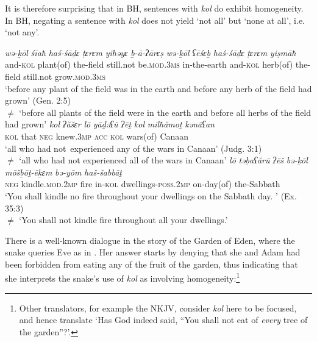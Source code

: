 \documentclass[output=paper]{langsci/langscibook}
\begin{document}
It is therefore surprising that in BH, sentences with \textit{kol} do exhibit homogeneity. In BH, negating a sentence with \textit{kol} does not yield ‘not all’ but ‘none at all’, i.e. ‘not any’.\largerpage

\ea%
    \label{ex:doron:29}
    \ea
    \gll \textit{wə-ḵōl}     \textit{śīaħ}         \textit{haś-śāḏɛ} \textit{ṭɛrɛm}     \textit{yihǝyɛ}           \textit{ḇ-ā-ʔārɛṣ}    \textit{wə{}-ḵōl}    \textit{ʕēśɛḇ} \textit{haś-śāḏɛ} \textit{ṭɛrɛm} \textit{yiṣmāħ}\\
         and-\textsc{kol} plant(of) the-field  still.not be.\textsc{mod.3ms} in-the-earth and-\textsc{kol} herb(of) the-field still.not grow.\textsc{mod.3ms}\\
    \glt `before any plant of the field was in the earth and before any herb of the field had grown' (Gen. 2:5)\\ 
        ${\neq}$  `before all plants of the field were in the earth and before all herbs of the field had grown'
    \ex
    \gll \textit{kol}   \textit{ʔăšɛr} \textit{lō}     \textit{yāḏəʕū}      \textit{ʔēṯ}   \textit{kol}   \textit{milħămoṯ}   \textit{kənāʕan}\\
         \textsc{kol} that   \textsc{neg} knew.\textsc{3mp}  \textsc{acc} \textsc{kol} wars(of)    Canaan\\
    \glt `all who had not~experienced any of the wars in Canaan' (Judg. 3:1)\\
        ${\neq}$  `all who had not experienced all of the wars in Canaan'
    \ex
    \gll \textit{lō}     \textit{təḇaʕărū}               \textit{ʔēš}  \textit{bə-ḵōl}   \textit{mōšḇōṯ-ēḵɛm}              \textit{bə-yōm}      \textit{haš-šabbāṯ}\\
         \textsc{neg} kindle.\textsc{mod.2mp}  fire  in-\textsc{kol} dwellings-\textsc{poss.2mp}  on-day(of) the-Sabbath\\
    \glt `You shall kindle no fire throughout your dwellings on the Sabbath day. ' (Ex. 35:3)\\
        ${\neq}$  `You shall not kindle fire throughout all your dwellings.'
    \z
\z

There is a well-known dialogue in the story of the Garden of Eden, where the snake queries Eve as in . Her answer starts by denying that she and Adam had been forbidden from eating any of the fruit of the garden, thus indicating that she interprets the snake’s use of \textit{kol} as involving homogeneity:\footnote{Other translators, for example the NKJV, consider \textit{kol} here to be focused, and hence translate `Has God indeed said, ``You shall not eat of \textit{every} tree of the garden''?{'}.}
\end{document}
